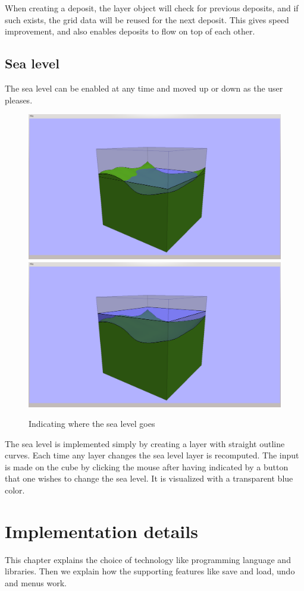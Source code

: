 \documentclass[a4paper,12pt]{report}
\begin{document}
When creating a deposit, the layer object will check for previous deposits, and if such exists, the grid data will be reused for the next deposit. This gives speed improvement, and also enables deposits to flow on top of each other.

\subsection{Sea level}
The sea level can be enabled at any time and moved up or down as the user pleases.

\begin{figure}
\includegraphics[trim = 90mm 7mm 80mm 30mm, clip,width=.5\linewidth]{thesis/results/seaEnabled.png}
\includegraphics[trim = 90mm 7mm 80mm 30mm, clip,width=.5\linewidth]{thesis/results/seaChanged.png}
 \caption{Indicating where the sea level goes}
 \label{fig:seaLevel}
\end{figure}

The sea level is implemented simply by creating a layer with straight outline curves. Each time any layer changes the sea level layer is recomputed. The input is made on the cube by clicking the mouse after having indicated by a button that one wishes to change the sea level. It is visualized with a transparent blue color.

\section{Implementation details}
\label{sec:tech}
This chapter explains the choice of technology like programming language and libraries. Then we explain how the supporting features like save and load, undo and menus work.
\end{document}
